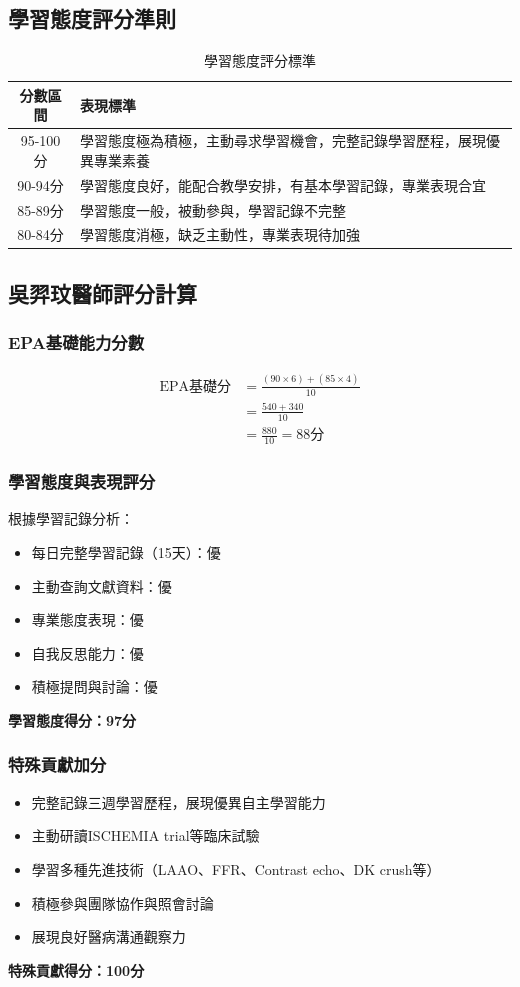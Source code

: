 \documentclass[12pt,a4paper]{article}
\begin{document}
\subsection{學習態度評分準則}

\begin{table}[h]
\centering
\caption{學習態度評分標準}
\begin{tabular}{|c|p{10cm}|}
\hline
\textbf{分數區間} & \textbf{表現標準} \\
\hline
95-100分 & 學習態度極為積極，主動尋求學習機會，完整記錄學習歷程，展現優異專業素養 \\
\hline
90-94分 & 學習態度良好，能配合教學安排，有基本學習記錄，專業表現合宜 \\
\hline
85-89分 & 學習態度一般，被動參與，學習記錄不完整 \\
\hline
80-84分 & 學習態度消極，缺乏主動性，專業表現待加強 \\
\hline
\end{tabular}
\end{table}

\subsection{吳羿玟醫師評分計算}

\subsubsection{EPA基礎能力分數}
\begin{align}
\text{EPA基礎分} &= \frac{(90 \times 6) + (85 \times 4)}{10}\\
&= \frac{540 + 340}{10}\\
&= \frac{880}{10} = 88\text{分}
\end{align}

\subsubsection{學習態度與表現評分}
根據學習記錄分析：
\begin{itemize}
\item 每日完整學習記錄（15天）：優
\item 主動查詢文獻資料：優  
\item 專業態度表現：優
\item 自我反思能力：優
\item 積極提問與討論：優
\end{itemize}
\textbf{學習態度得分：97分}

\subsubsection{特殊貢獻加分}
\begin{itemize}
\item 完整記錄三週學習歷程，展現優異自主學習能力
\item 主動研讀ISCHEMIA trial等臨床試驗
\item 學習多種先進技術（LAAO、FFR、Contrast echo、DK crush等）
\item 積極參與團隊協作與照會討論
\item 展現良好醫病溝通觀察力
\end{itemize}
\textbf{特殊貢獻得分：100分}
\end{document}
